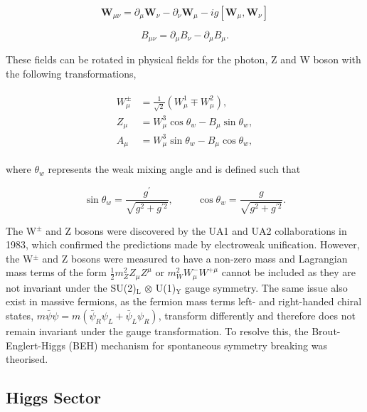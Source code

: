 \begin{equation}
\boldsymbol{W}_{\mu\nu} = \partial_{\mu} \boldsymbol{W}_{\nu} - \partial_{\nu} \boldsymbol{W}_{\mu} - ig[\boldsymbol{W}_{\mu},\boldsymbol{W}_{\nu}]
\end{equation}

\begin{equation}
B_{\mu\nu} = \partial_{\mu} B_{\nu} - \partial_{\mu} B_{\mu}.
\end{equation}

These fields can be rotated in physical fields for the photon, Z and W boson with the following transformations,

\begin{align}
\begin{split}
W^{\pm}_{\mu} &= \frac{1}{\sqrt{2}}(W^{1}_{\mu} \mp W^{2}_{\mu}), \\
Z_{\mu} &= W^{3}_{\mu} \cos\theta_{w} - B_{\mu} \sin\theta_w, \\
A_{\mu} &= W^{3}_{\mu} \sin\theta_{w} - B_{\mu} \cos\theta_w,
\end{split}
\label{eqn:rotations}
\end{align}

where $\theta_w$ represents the weak mixing angle and is defined such that

\begin{equation}
\sin\theta_w = \frac{g^{\prime}}{\sqrt{g^2 + g^{\prime 2}}}, \hspace{1cm} \cos\theta_w = \frac{g}{\sqrt{g^2 + g^{\prime 2}}}.
\end{equation}

The W$^{\pm}$ and Z bosons were discovered by the UA1 and UA2 collaborations in 1983, which confirmed the predictions made by electroweak unification.
However, the W$^{\pm}$ and Z bosons were measured to have a non-zero mass and Lagrangian mass terms of the form $\frac{1}{2}m_{Z}^2 Z_{\mu} Z^{\mu}$ or $m_{W}^2 W_{\mu}^{-}W^{+\mu}$ cannot be included as they are not invariant under the SU(2)$_{\text{L}}$ $\otimes$ U(1)$_{\text{Y}}$ gauge symmetry.
The same issue also exist in massive fermions, as the fermion mass terms left- and right-handed chiral states, $m\bar{\psi}\psi = m(\bar{\psi}_R \psi_L + \bar{\psi}_L \psi_R)$,  transform differently and therefore does not remain invariant under the gauge transformation.
To resolve this, the Brout-Englert-Higgs (BEH) mechanism for spontaneous symmetry breaking was theorised.

\subsection{Higgs Sector}

